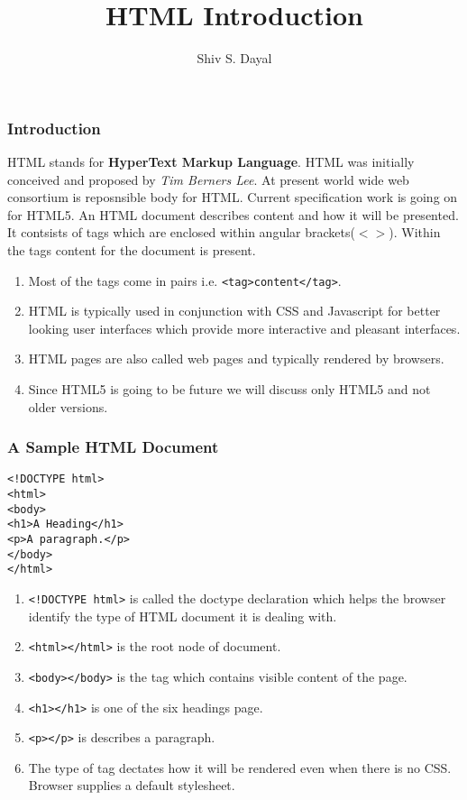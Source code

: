 \documentclass[aspectratio=1610]{beamer}
\begin{document}
\begin{frame}
\title{HTML Introduction}
\author{Shiv S. Dayal}
\titlepage
\end{frame}

\begin{frame}
\frametitle{Introduction}
HTML stands for \textbf{HyperText Markup Language}. HTML was initially
conceived and proposed by \textit{Tim Berners Lee}. At present world wide web
consortium is reposnsible body for HTML. Current specification work is going on
for HTML5. An HTML document describes content and how it will be presented.
It contsists of tags which are enclosed within angular brackets($<>$). Within the
tags content for the document is present.

\begin{enumerate}
\item Most of the tags come in pairs i.e. \texttt{<tag>content</tag>}.

\item HTML is typically used in conjunction with CSS and Javascript for better
looking user interfaces which provide more interactive and pleasant
interfaces. 

\item HTML pages are also called web pages and typically rendered by browsers.

\item Since HTML5 is going to be future we will discuss only HTML5 and not older
versions.
\end{enumerate}
\end{frame}

\begin{frame}[fragile]
\frametitle{A Sample HTML Document}
\begin{verbatim}
<!DOCTYPE html>
<html>
<body>
<h1>A Heading</h1>
<p>A paragraph.</p>
</body>
</html>
\end{verbatim}
\begin{enumerate}
\item \texttt{<!DOCTYPE html>} is called the doctype declaration which helps the
browser identify the type of HTML document it is dealing with.

\item \texttt{<html></html>} is the root node of document.

\item \texttt{<body></body>} is the tag which contains visible content of the
  page.
\item \texttt{<h1></h1>} is one of the six headings page.
\item \texttt{<p></p>} is describes a paragraph.
\item The type of tag dectates how it will be rendered even when there is no
  CSS. Browser supplies a default stylesheet.
\end{enumerate}
\end{frame}
\end{document}
